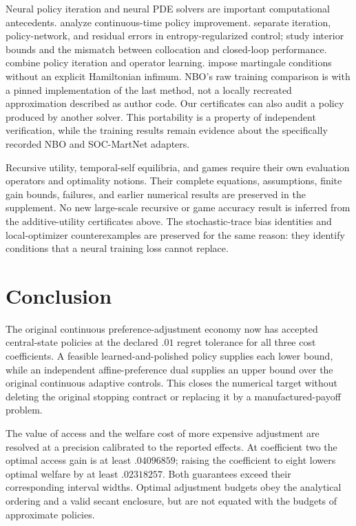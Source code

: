Neural policy iteration and neural PDE solvers are important computational antecedents. \citet{jacka2015} analyze continuous-time policy improvement. \citet{kim2026explore} separate iteration, policy-network, and residual errors in entropy-regularized control; \citet{kim2026interior} study interior bounds and the mismatch between collocation and closed-loop performance. \citet{lee2025} combine policy iteration and operator learning. \citet{cai2025published} impose martingale conditions without an explicit Hamiltonian infimum. NBO's raw training comparison is with a pinned implementation of the last method, not a locally recreated approximation described as author code. Our certificates can also audit a policy produced by another solver. This portability is a property of independent verification, while the training results remain evidence about the specifically recorded NBO and SOC-MartNet adapters.

Recursive utility, temporal-self equilibria, and games require their own evaluation operators and optimality notions. Their complete equations, assumptions, finite gain bounds, failures, and earlier numerical results are preserved in the supplement. No new large-scale recursive or game accuracy result is inferred from the additive-utility certificates above. The stochastic-trace bias identities and local-optimizer counterexamples are preserved for the same reason: they identify conditions that a neural training loss cannot replace.

\section{Conclusion}
The original continuous preference-adjustment economy now has accepted central-state policies at the declared $.01$ regret tolerance for all three cost coefficients. A feasible learned-and-polished policy supplies each lower bound, while an independent affine-preference dual supplies an upper bound over the original continuous adaptive controls. This closes the numerical target without deleting the original stopping contract or replacing it by a manufactured-payoff problem.

The value of access and the welfare cost of more expensive adjustment are resolved at a precision calibrated to the reported effects. At coefficient two the optimal access gain is at least $.04096859$; raising the coefficient to eight lowers optimal welfare by at least $.02318257$. Both guarantees exceed their corresponding interval widths. Optimal adjustment budgets obey the analytical ordering and a valid secant enclosure, but are not equated with the budgets of approximate policies.

